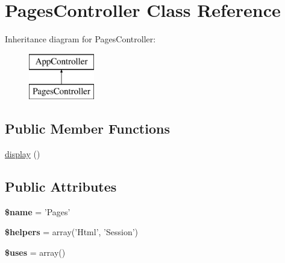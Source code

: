 \hypertarget{classPagesController}{
\section{\-Pages\-Controller \-Class \-Reference}
\label{classPagesController}
}
\-Inheritance diagram for \-Pages\-Controller\-:\begin{figure}[H]
\begin{center}
\leavevmode
\includegraphics[height=2.000000cm]{classPagesController}
\end{center}
\end{figure}
\subsection*{\-Public \-Member \-Functions}
\begin{DoxyCompactItemize}
\item 
\hyperlink{classPagesController_a89f9b1e71fee5206f00be501df9c02e3}{display} ()
\end{DoxyCompactItemize}
\subsection*{\-Public \-Attributes}
\begin{DoxyCompactItemize}
\item 
\hypertarget{classPagesController_a8d4fa2edc8b67a9de41fd7cbf83faed0}{
{\bfseries \$name} = '\-Pages'}
\label{classPagesController_a8d4fa2edc8b67a9de41fd7cbf83faed0}

\item 
\hypertarget{classPagesController_a9dc3eac2482fd7925ed341208582c19a}{
{\bfseries \$helpers} = array('\-Html', '\-Session')}
\label{classPagesController_a9dc3eac2482fd7925ed341208582c19a}

\item 
\hypertarget{classPagesController_a75299c2f1604e1dba43af8f4234e4245}{
{\bfseries \$uses} = array()}
\label{classPagesController_a75299c2f1604e1dba43af8f4234e4245}

\end{DoxyCompactItemize}


